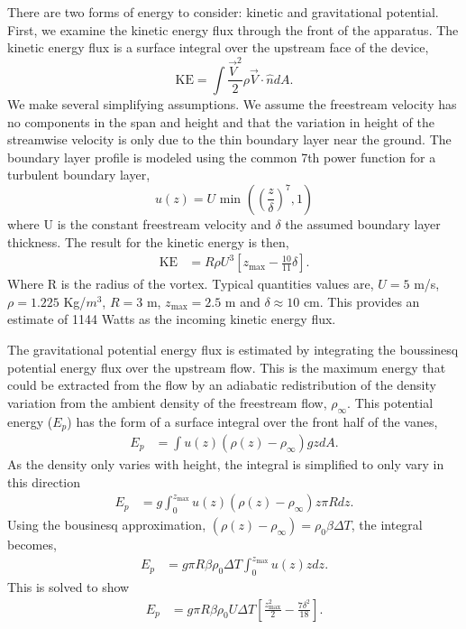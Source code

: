 There are two forms of energy to consider: kinetic and gravitational
potential. First, we examine the kinetic energy flux through the front
of the apparatus. 
The kinetic energy flux is a surface integral over the upstream face of
the device,  
\begin{equation*}
\text{KE} = \int \frac{\vec V^2}{2} \rho \vec V \cdot \hat n dA.
\end{equation*}
%
%
We make several simplifying assumptions. We assume the freestream 
velocity has no components in the span and height and
that the variation in height of the streamwise
velocity is only due to the thin boundary layer near the
ground. The boundary layer profile is modeled using the common 7th
power function for a turbulent boundary layer,  
\begin{equation*}
  u(z) = U \text{ min }\left(\left(\frac{z}{\delta}\right)^7,1\right)
\end{equation*}
where U is the constant freestream velocity and $\delta$ the assumed
boundary layer thickness. 
The result for the kinetic energy is then, 
\begin{align*}
\text{KE} & = R \rho U^3 \left[ z_{\text{max}} - \frac{10}{11}\delta
\right].
\end{align*}
Where R is the radius of the vortex. Typical quantities values are, $U = 5$ m/s, $\rho =
1.225$ Kg/$m^3$, $R = 3$ m, $z_{\text{max}} = 2.5$ m and $\delta \approx
10$ cm. This provides an estimate of 1144 Watts as the incoming kinetic
energy flux. 

The gravitational potential energy flux is estimated by integrating the
boussinesq potential energy flux over the upstream flow. 
This is the maximum energy that could be extracted from the flow by an 
adiabatic redistribution of the density variation from the ambient 
density of the freestream flow, $\rho_\infty$. 
This potential energy ($E_p$) has the form of a surface integral over 
the front half of the vanes, 
\begin{align*}
  E_p & = \int u(z) (\rho(z)-\rho_\infty) g z dA. 
\end{align*}
As the density only varies with height, the integral is simplified to only vary in 
this direction
\begin{align*}
  E_p  & = g \int^{z_\text{max}}_0 u(z) (\rho(z)-\rho_\infty) z  \pi R dz.
\end{align*}
Using the bousinesq approximation, $(\rho(z)-\rho_\infty)  = \rho_0 \beta \Delta T$,
the integral becomes, 
\begin{align*}
  E_p & = g  \pi R \beta \rho_0 \Delta T \int^{z_\text{max}}_0 u(z) z dz.
\end{align*}
This is solved to show
\begin{align*}
  E_p & = g  \pi R \beta \rho_0 U \Delta T \left[ \frac{z_\text{max}^2}{2} - \frac{7 \delta^2}{18} \right].
\end{align*}

